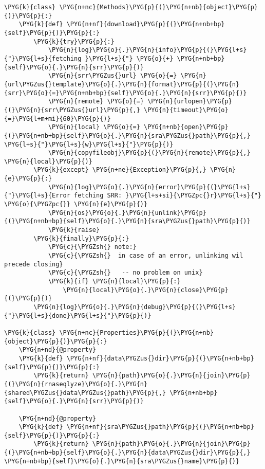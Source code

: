 \begin{Verbatim}[commandchars=\\\{\}]
\PYG{k}{class} \PYG{n+nc}{Methods}\PYG{p}{(}\PYG{n+nb}{object}\PYG{p}{)}\PYG{p}{:}
    \PYG{k}{def} \PYG{n+nf}{download}\PYG{p}{(}\PYG{n+nb+bp}{self}\PYG{p}{)}\PYG{p}{:}
        \PYG{k}{try}\PYG{p}{:}
            \PYG{n}{log}\PYG{o}{.}\PYG{n}{info}\PYG{p}{(}\PYG{l+s}{"}\PYG{l+s}{fetching }\PYG{l+s}{"} \PYG{o}{+} \PYG{n+nb+bp}{self}\PYG{o}{.}\PYG{n}{srr}\PYG{p}{)}
            \PYG{n}{srr\PYGZus{}url} \PYG{o}{=} \PYG{n}{url\PYGZus{}template}\PYG{o}{.}\PYG{n}{format}\PYG{p}{(}\PYG{n}{srr}\PYG{o}{=}\PYG{n+nb+bp}{self}\PYG{o}{.}\PYG{n}{srr}\PYG{p}{)}
            \PYG{n}{remote} \PYG{o}{=} \PYG{n}{urlopen}\PYG{p}{(}\PYG{n}{srr\PYGZus{}url}\PYG{p}{,} \PYG{n}{timeout}\PYG{o}{=}\PYG{l+m+mi}{60}\PYG{p}{)}
            \PYG{n}{local} \PYG{o}{=} \PYG{n+nb}{open}\PYG{p}{(}\PYG{n+nb+bp}{self}\PYG{o}{.}\PYG{n}{sra\PYGZus{}path}\PYG{p}{,} \PYG{l+s}{"}\PYG{l+s}{w}\PYG{l+s}{"}\PYG{p}{)}
            \PYG{n}{copyfileobj}\PYG{p}{(}\PYG{n}{remote}\PYG{p}{,} \PYG{n}{local}\PYG{p}{)}
        \PYG{k}{except} \PYG{n+ne}{Exception}\PYG{p}{,} \PYG{n}{e}\PYG{p}{:}
            \PYG{n}{log}\PYG{o}{.}\PYG{n}{error}\PYG{p}{(}\PYG{l+s}{"}\PYG{l+s}{Error fetching SRR: }\PYG{l+s+si}{\PYGZpc{}r}\PYG{l+s}{"} \PYG{o}{\PYGZpc{}} \PYG{n}{e}\PYG{p}{)}
            \PYG{n}{os}\PYG{o}{.}\PYG{n}{unlink}\PYG{p}{(}\PYG{n+nb+bp}{self}\PYG{o}{.}\PYG{n}{sra\PYGZus{}path}\PYG{p}{)}
            \PYG{k}{raise}
        \PYG{k}{finally}\PYG{p}{:}
            \PYG{c}{\PYGZsh{} note:}
            \PYG{c}{\PYGZsh{}  in case of an error, unlinking wil precede closing}
            \PYG{c}{\PYGZsh{}   -- no problem on unix}
            \PYG{k}{if} \PYG{n}{local}\PYG{p}{:}
                \PYG{n}{local}\PYG{o}{.}\PYG{n}{close}\PYG{p}{(}\PYG{p}{)}
        \PYG{n}{log}\PYG{o}{.}\PYG{n}{debug}\PYG{p}{(}\PYG{l+s}{"}\PYG{l+s}{done}\PYG{l+s}{"}\PYG{p}{)}

\PYG{k}{class} \PYG{n+nc}{Properties}\PYG{p}{(}\PYG{n+nb}{object}\PYG{p}{)}\PYG{p}{:}
    \PYG{n+nd}{@property}
    \PYG{k}{def} \PYG{n+nf}{data\PYGZus{}dir}\PYG{p}{(}\PYG{n+nb+bp}{self}\PYG{p}{)}\PYG{p}{:}
        \PYG{k}{return} \PYG{n}{path}\PYG{o}{.}\PYG{n}{join}\PYG{p}{(}\PYG{n}{rnaseqlyze}\PYG{o}{.}\PYG{n}{shared\PYGZus{}data\PYGZus{}path}\PYG{p}{,} \PYG{n+nb+bp}{self}\PYG{o}{.}\PYG{n}{srr}\PYG{p}{)}

    \PYG{n+nd}{@property}
    \PYG{k}{def} \PYG{n+nf}{sra\PYGZus{}path}\PYG{p}{(}\PYG{n+nb+bp}{self}\PYG{p}{)}\PYG{p}{:}
        \PYG{k}{return} \PYG{n}{path}\PYG{o}{.}\PYG{n}{join}\PYG{p}{(}\PYG{n+nb+bp}{self}\PYG{o}{.}\PYG{n}{data\PYGZus{}dir}\PYG{p}{,} \PYG{n+nb+bp}{self}\PYG{o}{.}\PYG{n}{sra\PYGZus{}name}\PYG{p}{)}


\end{Verbatim}
